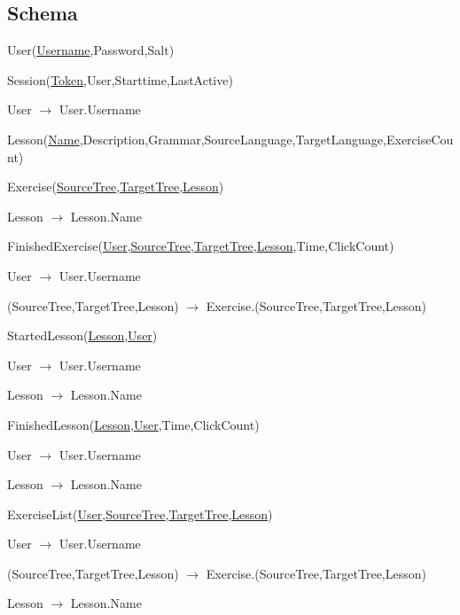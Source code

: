 \documentclass{scrartcl}
\begin{document}
\subsection{Schema}
\begin{description}
\item User(\underline{Username},Password,Salt)
\item Session(\underline{Token},User,Starttime,LastActive)
  \begin{description}
  \item User $\rightarrow$ User.Username
  \end{description}
\item Lesson(\underline{Name},Description,Grammar,SourceLanguage,TargetLanguage,ExerciseCount)
\item Exercise(\underline{SourceTree},\underline{TargetTree},\underline{Lesson})
  \begin{description}
  \item Lesson $\rightarrow$ Lesson.Name
  \end{description}
\item FinishedExercise(\underline{User},\underline{SourceTree},\underline{TargetTree},\underline{Lesson},Time,ClickCount)
  \begin{description}
  \item User $\rightarrow$ User.Username
  \item (SourceTree,TargetTree,Lesson) $\rightarrow$ Exercise.(SourceTree,TargetTree,Lesson)
  \end{description}
\item StartedLesson(\underline{Lesson},\underline{User})
  \begin{description}
  \item User $\rightarrow$ User.Username
  \item Lesson $\rightarrow$ Lesson.Name
  \end{description}
\item FinishedLesson(\underline{Lesson},\underline{User},Time,ClickCount)
  \begin{description}
  \item User $\rightarrow$ User.Username
  \item Lesson $\rightarrow$ Lesson.Name
  \end{description}
\item ExerciseList(\underline{User},\underline{SourceTree},\underline{TargetTree},\underline{Lesson})
  \begin{description}
  \item User $\rightarrow$ User.Username
  \item (SourceTree,TargetTree,Lesson) $\rightarrow$ Exercise.(SourceTree,TargetTree,Lesson)
  \item Lesson $\rightarrow$ Lesson.Name
  \end{description}
\end{description}
\end{document}
